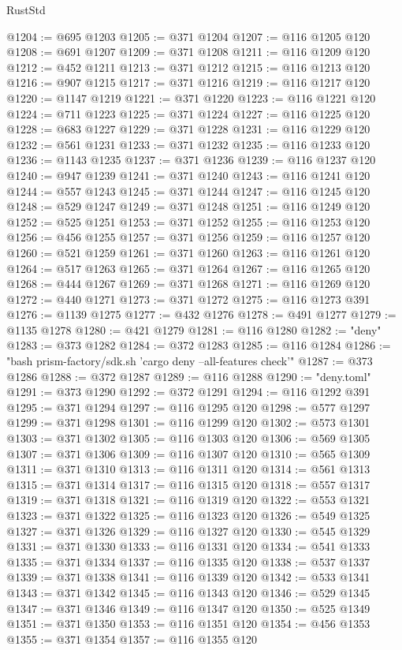 \begin{lexlean}{RustStd}
\begin{coremodule}
@1204 := @695 @1203
@1205 := @371 @1204
@1207 := @116 @1205 @120
@1208 := @691 @1207
@1209 := @371 @1208
@1211 := @116 @1209 @120
@1212 := @452 @1211
@1213 := @371 @1212
@1215 := @116 @1213 @120
@1216 := @907 @1215
@1217 := @371 @1216
@1219 := @116 @1217 @120
@1220 := @1147 @1219
@1221 := @371 @1220
@1223 := @116 @1221 @120
@1224 := @711 @1223
@1225 := @371 @1224
@1227 := @116 @1225 @120
@1228 := @683 @1227
@1229 := @371 @1228
@1231 := @116 @1229 @120
@1232 := @561 @1231
@1233 := @371 @1232
@1235 := @116 @1233 @120
@1236 := @1143 @1235
@1237 := @371 @1236
@1239 := @116 @1237 @120
@1240 := @947 @1239
@1241 := @371 @1240
@1243 := @116 @1241 @120
@1244 := @557 @1243
@1245 := @371 @1244
@1247 := @116 @1245 @120
@1248 := @529 @1247
@1249 := @371 @1248
@1251 := @116 @1249 @120
@1252 := @525 @1251
@1253 := @371 @1252
@1255 := @116 @1253 @120
@1256 := @456 @1255
@1257 := @371 @1256
@1259 := @116 @1257 @120
@1260 := @521 @1259
@1261 := @371 @1260
@1263 := @116 @1261 @120
@1264 := @517 @1263
@1265 := @371 @1264
@1267 := @116 @1265 @120
@1268 := @444 @1267
@1269 := @371 @1268
@1271 := @116 @1269 @120
@1272 := @440 @1271
@1273 := @371 @1272
@1275 := @116 @1273 @391
@1276 := @1139 @1275
@1277 := @432 @1276
@1278 := @491 @1277
@1279 := @1135 @1278
@1280 := @421 @1279
@1281 := @116 @1280
@1282 := "deny"
@1283 := @373 @1282
@1284 := @372 @1283
@1285 := @116 @1284
@1286 := "bash prism-factory/sdk.sh 'cargo deny --all-features check'"
@1287 := @373 @1286
@1288 := @372 @1287
@1289 := @116 @1288
@1290 := "deny.toml"
@1291 := @373 @1290
@1292 := @372 @1291
@1294 := @116 @1292 @391
@1295 := @371 @1294
@1297 := @116 @1295 @120
@1298 := @577 @1297
@1299 := @371 @1298
@1301 := @116 @1299 @120
@1302 := @573 @1301
@1303 := @371 @1302
@1305 := @116 @1303 @120
@1306 := @569 @1305
@1307 := @371 @1306
@1309 := @116 @1307 @120
@1310 := @565 @1309
@1311 := @371 @1310
@1313 := @116 @1311 @120
@1314 := @561 @1313
@1315 := @371 @1314
@1317 := @116 @1315 @120
@1318 := @557 @1317
@1319 := @371 @1318
@1321 := @116 @1319 @120
@1322 := @553 @1321
@1323 := @371 @1322
@1325 := @116 @1323 @120
@1326 := @549 @1325
@1327 := @371 @1326
@1329 := @116 @1327 @120
@1330 := @545 @1329
@1331 := @371 @1330
@1333 := @116 @1331 @120
@1334 := @541 @1333
@1335 := @371 @1334
@1337 := @116 @1335 @120
@1338 := @537 @1337
@1339 := @371 @1338
@1341 := @116 @1339 @120
@1342 := @533 @1341
@1343 := @371 @1342
@1345 := @116 @1343 @120
@1346 := @529 @1345
@1347 := @371 @1346
@1349 := @116 @1347 @120
@1350 := @525 @1349
@1351 := @371 @1350
@1353 := @116 @1351 @120
@1354 := @456 @1353
@1355 := @371 @1354
@1357 := @116 @1355 @120

\end{coremodule}
\end{lexlean}
